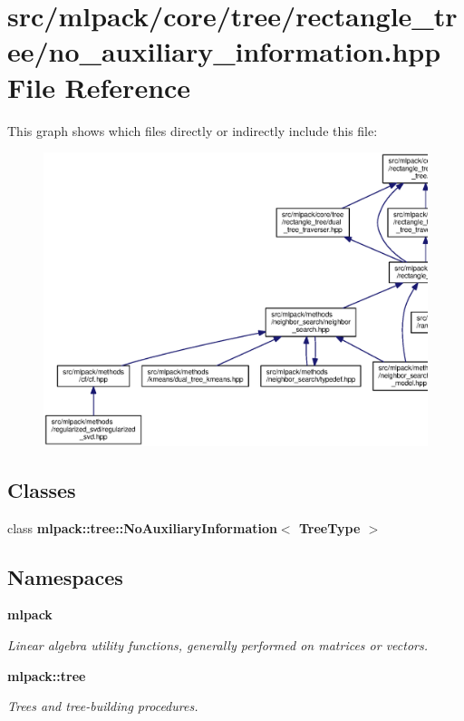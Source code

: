 \section{src/mlpack/core/tree/rectangle\+\_\+tree/no\+\_\+auxiliary\+\_\+information.hpp File Reference}
\label{no__auxiliary__information_8hpp}
This graph shows which files directly or indirectly include this file\+:
\nopagebreak
\begin{figure}[H]
\begin{center}
\leavevmode
\includegraphics[width=350pt]{no__auxiliary__information_8hpp__dep__incl}
\end{center}
\end{figure}
\subsection*{Classes}
\begin{DoxyCompactItemize}
\item 
class {\bf mlpack\+::tree\+::\+No\+Auxiliary\+Information$<$ Tree\+Type $>$}
\end{DoxyCompactItemize}
\subsection*{Namespaces}
\begin{DoxyCompactItemize}
\item 
 {\bf mlpack}
\begin{DoxyCompactList}\small\item\em Linear algebra utility functions, generally performed on matrices or vectors. \end{DoxyCompactList}\item 
 {\bf mlpack\+::tree}
\begin{DoxyCompactList}\small\item\em Trees and tree-\/building procedures. \end{DoxyCompactList}\end{DoxyCompactItemize}


